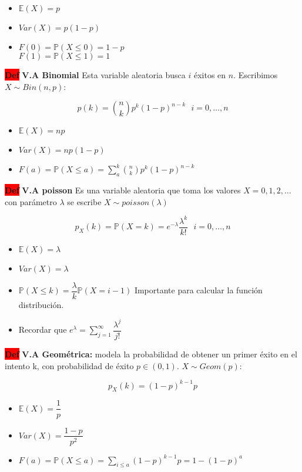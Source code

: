 \documentclass[letterpaper,10.5pt,twocolumn]{article} %
\newcommand{\E}{\mathbb{E} }
\newcommand{\Proba}{\mathbb{P} }
\newcommand{\hlc}[2][yellow]{ \colorbox{#1}{#2} }
\newcommand{\Def}{\hlc[red]{\bfseries Def}}
\begin{document}
\begin{itemize}
    \item $\E(X)=p$
    \item $Var(X) = p(1-p) $
    \item $F(0) = \Proba (X\leq 0) = 1-p $ \\ $F(1) = \Proba (X\leq 1) = 1 $ 
\end{itemize}

\Def \textbf{V.A Binomial} Esta variable aleatoria busca $i$ éxitos
en $n$. Escribimos $X \sim Bin(n,p)$:

\begin{equation*}
    p(k) = \binom{n}{k} p^k (1-p)^{n-k}\ \ \ i=0,\ldots,n
\end{equation*}

\begin{itemize}
    \item $\E(X)=np$
    \item $Var(X) = np(1-p) $
    \item $F(a) = \Proba (X\leq a) = \sum_{a}^{k} \binom{n}{k} p^k (1-p)^{n-k} $
\end{itemize}

\Def \textbf{V.A poisson} Es una variable aleatoria que toma los valores $X = 0,1,2,\ldots$ con parámetro $\lambda$ se escribe $X\sim poisson(\lambda)$

\begin{equation*}
    p_X (k) = \Proba (X=k) = e^{-\lambda} \dfrac{\lambda^k}{k!}\ \ \ i = 0,\ldots,n
\end{equation*}

\begin{itemize}
    \item $\E(X)=\lambda $
    \item $Var(X) = \lambda $
    \item $\Proba (X\leq k) = \dfrac{\lambda}{k} \Proba (X=i-1) $ Importante para calcular la función distribución.
    \item Recordar que $e^{\lambda} = \sum_{j=1}^{\infty} \dfrac{\lambda^j}{j!} $
\end{itemize}

\Def \textbf{V.A Geométrica:} modela la probabilidad de obtener un primer éxito en el intento k, con probabilidad de éxito $p\in (0,1) $. $X\sim Geom(p)$:

\begin{equation*}
    p_X(k) = (1-p)^{k-1} p 
\end{equation*}

\begin{itemize}
    \item $\E(X)=\dfrac{1}{p} $
    \item $Var(X) = \dfrac{1-p}{p^2} $
    \item $F(a) = \Proba (X \leq a) = \sum_{i\leq a}^{} (1-p)^{k-1} p = 1 - (1-p)^a $
\end{itemize}
\end{document}
